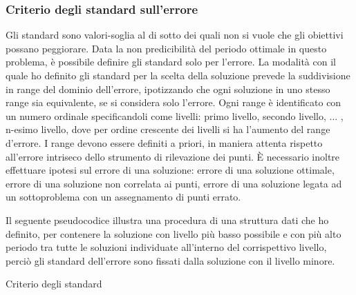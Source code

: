 \documentclass[a4paper,12pt]{report}
\begin{document}
\subsubsection{Criterio degli standard sull'errore}
\label{sss:standard}
Gli standard sono valori-soglia al di sotto dei quali non si vuole che gli
obiettivi possano peggiorare. Data la non predicibilità del periodo ottimale in questo problema, è possibile definire gli standard solo per l'errore. La modalità con il quale ho definito gli standard per la scelta della soluzione prevede la suddivisione in range del dominio dell'errore, ipotizzando che ogni soluzione in uno stesso range sia equivalente, se si considera solo l'errore. Ogni range è identificato con un numero ordinale specificandoli come livelli: primo livello, secondo livello, ... , n-esimo livello, dove per ordine crescente dei livelli si ha l'aumento del range d'errore. I range devono essere definiti a priori, in maniera attenta rispetto all'errore intriseco dello strumento di rilevazione dei punti. È necessario inoltre effettuare ipotesi sul errore di una soluzione: errore di una soluzione ottimale, errore di una soluzione non correlata ai punti, errore di una soluzione legata ad un sottoproblema con un assegnamento di punti errato.

Il seguente pseudocodice illustra una procedura di una struttura dati che ho definito, per contenere la soluzione con livello più basso possibile e con più alto periodo tra tutte le soluzioni individuate all'interno del corrispettivo livello, perciò gli standard dell'errore sono fissati dalla soluzione con il livello minore.
\begin{algorithm}
\caption{Criterio degli standard}\label{alg: standard}
\eIf{\LivelloDi{\SolCorrente} $<$ \LivelloDi{\SolOttimale}}{ \label{std:min}
    $\SolOttimale \gets \SolCorrente$\\
}{\If{\LivelloDi{\SolCorrente} $=$ \LivelloDi{\SolOttimale}}{
      \eIf{\LivelloDi{\SolCorrente} $=$ \UltimoLv } {
          \If{$\SolCorrente[errore] < \SolOttimale[errore]$}{ \label{std:last}
              $\SolOttimale \gets \SolCorrente$\\
          }
       } {
          \If{$\SolCorrente[periodo] > \SolOttimale[periodo]$}{ \label{std:per}
              $\SolOttimale \gets \SolCorrente$\\
          }
       }
  }
}
\end{algorithm}
\end{document}
